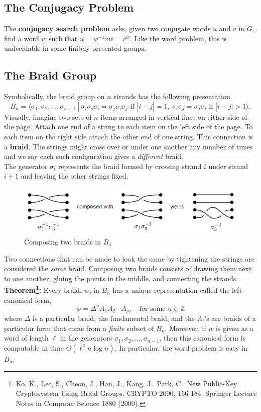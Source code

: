 \documentclass[11pt]{article}
\newcommand{\integers}{\mathbb{Z}}
\begin{document}
\subsection*{The Conjugacy Problem}
The \textbf{conjugacy search problem} asks, given two conjugate words $u$ and $v$ in $G$, find a word $w$ such that $u = w^{-1}vw = v^w$. Like the word problem, this is undecidable in some finitely presented groups.

\subsection*{The Braid Group}
Symbolically, the braid group on $n$ strands has the following presentation
\[
B_n = \langle \sigma_1, \sigma_2, \ldots, \sigma_{n-1}\ |\  \sigma_i\sigma_j\sigma_i = \sigma_j\sigma_i\sigma_j\text{ if }|i-j| = 1,\ \sigma_i\sigma_j = \sigma_j\sigma_i\text{ if }|i-j|>1\rangle.
\]
Visually, imagine two sets of $n$ items arranged in vertical lines on either side of the page. Attach one end of a string to each item on the left side of the page. To each item on the right side attach the other end of one string. This connection is a \textbf{braid}. The strings might cross over or under one another any number of times and we say each such configuration gives a \textit{different} braid.\\
\indent The generator $\sigma_i$ represents the braid formed by crossing strand $i$ under strand $i+1$ and leaving the other strings fixed.
\begin{figure}[h]
\centering
	\includegraphics[scale=.61]{composition.PNG}
\caption{Composing two braids in $B_4$}
\end{figure}

\indent Two connections that can be made to look the same by tightening the strings are considered the \textit{same} braid. Composing two braids consists of drawing them next to one another, gluing the points in the middle, and connecting the strands.\\


\noindent \textbf{Theorem\footnote{Ko, K., Lee, S., Cheon, J., Han, J., Kang, J., Park, C.. New Public-Key Cryptosystem Using Braid Groups. CRYPTO 2000, 166-184. Springer Lecture Notes in Computer Science 1880 (2000).}: }Every braid, $w$, in $B_n$ has a unique representation called the left-canonical form,
\[
w = \Delta^uA_1A_2\cdots A_p,\quad \text{for some }u\in \integers
\]
where $\Delta$ is a particular braid, the fundamental braid, and the $A_i$'s are braids of a particular form that come from a \textit{finite} subset of $B_n$. Moreover, if $w$ is given as a word of length $\ell$ in the generators $\sigma_1, \sigma_2, \ldots, \sigma_{n-1}$, then this canonical form is computable in time $O(\ell^2n\log n)$. In particular, the word problem is easy in $B_n$.
\end{document}
